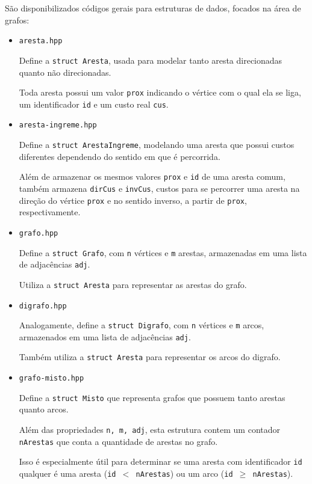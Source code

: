 São disponibilizados códigos gerais para estruturas de dados, focados na área de grafos:
\begin{itemize}
    \item \texttt{aresta.hpp} 

        Define a \texttt{struct Aresta}, usada para modelar tanto aresta direcionadas quanto não direcionadas.

    Toda aresta possui um valor  \texttt{prox} indicando o vértice com o qual ela se liga, um identificador \texttt{id} e um custo real \texttt{cus}.
    \item \texttt{aresta-ingreme.hpp}

        Define a \texttt{struct ArestaIngreme}, modelando uma aresta que possui custos diferentes dependendo do sentido em que é percorrida.

        Além de armazenar os mesmos valores \texttt{prox} e \texttt{id} de uma aresta comum, também armazena \texttt{dirCus} e \texttt{invCus}, custos para se percorrer uma aresta na direção do vértice \texttt{prox} e no sentido inverso, a partir de \texttt{prox}, respectivamente.

    \item \texttt{grafo.hpp} 
        
        Define a \texttt{struct Grafo}, com \texttt{n} vértices e \texttt{m} arestas, armazenadas em uma lista de adjacências \texttt{adj}.

        Utiliza a \texttt{struct Aresta} para representar as arestas do grafo.

    \item \texttt{digrafo.hpp}

        Analogamente, define a \texttt{struct Digrafo}, com \texttt{n} vértices e \texttt{m} arcos, armazenados em uma lista de adjacências \texttt{adj}.

        Também utiliza a \texttt{struct Aresta} para representar os arcos do digrafo.

    \item \texttt{grafo-misto.hpp}

        Define a \texttt{struct Misto} que representa grafos que possuem tanto arestas quanto arcos. 

        Além das propriedades \texttt{n, m, adj}, esta estrutura contem um contador \texttt{nArestas} que conta a quantidade de arestas no grafo.

        Isso é especialmente útil para determinar se uma aresta com identificador \texttt{id} qualquer é uma aresta (\texttt{id $<$ nArestas}) ou um arco (\texttt{id $\geq$ nArestas}).


\end{itemize}
